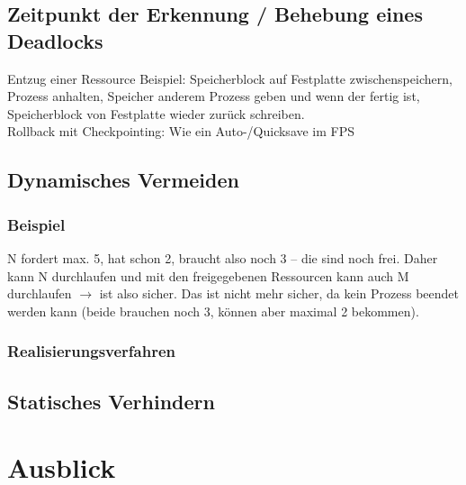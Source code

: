 \subsection{Zeitpunkt der Erkennung / Behebung eines Deadlocks}
Entzug einer Ressource Beispiel: Speicherblock auf Festplatte zwischenspeichern, Prozess anhalten, Speicher anderem Prozess geben und wenn der fertig ist, Speicherblock von Festplatte wieder zurück schreiben.\\
Rollback mit Checkpointing: Wie ein Auto-/Quicksave im FPS 

\subsection{Dynamisches Vermeiden}
\subsubsection*{Beispiel}
N fordert max. 5, hat schon 2, braucht also noch 3 -- die sind noch frei. Daher kann N durchlaufen und mit den freigegebenen Ressourcen kann auch M durchlaufen $\to$ ist also sicher.
Das ist nicht mehr sicher, da kein Prozess beendet werden kann (beide brauchen noch 3, können aber maximal 2 bekommen).
\subsubsection{Realisierungsverfahren}

\subsection{Statisches Verhindern}

\section{Ausblick}


